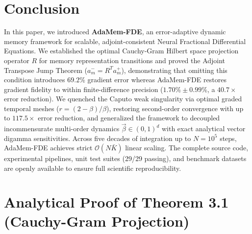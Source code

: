 \documentclass[11pt,a4paper]{article}
\theoremstyle{plain}
\theoremstyle{definition}
\begin{document}
\section{Conclusion}
\label{sec:conclusion}

In this paper, we introduced \textbf{AdaMem-FDE}, an error-adaptive dynamic memory framework for scalable, adjoint-consistent Neural Fractional Differential Equations. We established the optimal Cauchy-Gram Hilbert space projection operator $R$ for memory representation transitions and proved the Adjoint Transpose Jump Theorem ($a_m^- = R^T a_m^+$), demonstrating that omitting this condition introduces $69.2\%$ gradient error whereas AdaMem-FDE restores gradient fidelity to within finite-difference precision ($1.70\% \pm 0.99\%$, a $40.7\times$ error reduction). We quenched the Caputo weak singularity via optimal graded temporal meshes ($r = (2-\beta)/\beta$), restoring second-order convergence with up to $117.5\times$ error reduction, and generalized the framework to decoupled incommensurate multi-order dynamics $\vec{\beta} \in (0, 1)^d$ with exact analytical vector digamma sensitivities. Across five decades of integration up to $N = 10^5$ steps, AdaMem-FDE achieves strict $\mathcal{O}(N \bar{K})$ linear scaling. The complete source code, experimental pipelines, unit test suites (29/29 passing), and benchmark datasets are openly available to ensure full scientific reproducibility.




\newpage
\appendix
\section{Analytical Proof of Theorem 3.1 (Cauchy-Gram Projection)}
\label{sec:appendix_proofs}
\end{document}
